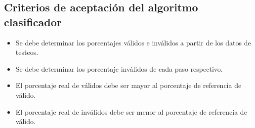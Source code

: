 \subsection{Criterios de aceptaci\'on del algoritmo clasificador}
\begin{itemize}
	\item Se debe determinar los porcentajes v\'alidos e inv\'alidos a partir de los datos de testeos.
	\item Se debe determinar los porcentaje inv\'alidos de cada paso respectivo.
	\item El porcentaje real de v\'alidos debe ser mayor al porcentaje de referencia de v\'alido.
	\item El porcentaje real de inv\'alidos debe ser menor al porcentaje de referencia de v\'alido.
\end{itemize}